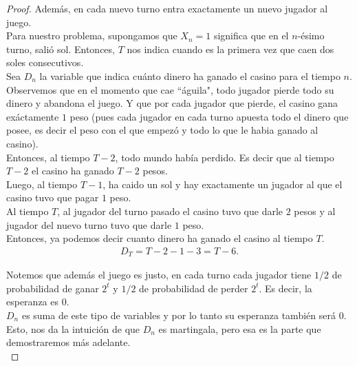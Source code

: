 \begin{proof}
		Además, en cada nuevo turno entra exactamente un nuevo jugador al juego.\\
	   
		Para nuestro problema, supongamos que $X_n = 1$ significa que en el $n$-ésimo turno, salió sol.
		Entonces, $T$ nos indica cuando es la primera vez que caen dos soles consecutivos.\\
	   
		Sea $D_n$ la variable que indica cuánto dinero ha ganado el casino para el tiempo $n$.\\
	   
		Observemos que en el momento que cae ``águila", todo jugador pierde todo su dinero y abandona el juego.
		Y que por cada jugador que pierde, el casino gana exáctamente $1$ peso (pues cada jugador en cada
		turno apuesta todo el dinero que posee, es decir el peso con el que empezó y todo lo que le habia
		ganado al casino).\\
	   
		Entonces, al tiempo $T-2$, todo mundo había perdido. Es decir que al tiempo $T-2$ el casino ha ganado
		$T-2$ pesos.\\
	   
		Luego, al tiempo $T-1$, ha caido un sol y hay exactamente un jugador al que el casino tuvo 
		que pagar $1$ peso.\\
	   
		Al tiempo $T$, al jugador del turno pasado el casino tuvo que darle $2$ pesos y al jugador del nuevo
		turno tuvo que darle $1$ peso.\\
	   
		Entonces, ya podemos decir cuanto dinero ha ganado el casino al tiempo $T$.
		\begin{align}\label{problema1_3:Dinero_al_tiempo_T}
			D_T = T-2 - 1 - 3 = T - 6. 
		\end{align}					   
	   
		Notemos que además el juego es justo, en cada turno cada jugador tiene $1/2$ de probabilidad de
		ganar $2^t$ y $1/2$ de probabilidad de perder $2^t$. Es decir, la esperanza es $0$.\\
		
		$D_n$ es suma de este tipo de variables y por lo tanto su esperanza también será $0$.\\
	   
		Esto, nos da la intuición de que $D_n$ es martingala, pero esa es la parte que demostraremos más adelante.\\
	   

\end{proof}

